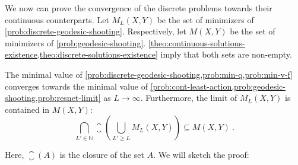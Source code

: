 We now can prove the convergence of the discrete problems towards their continuous counterparts.
Let $M_L(X, Y)$ be the set of minimizers of \cref{prob:discrete-geodesic-shooting}.
Respectively, let $M(X, Y)$ be the set of minimizers of \cref{prob:geodesic-shooting}.
\cref{theo:continuous-solutions-existence,theo:discrete-solutions-existence} imply that both sets are non-empty.
\begin{theorem}
	\label{theo:problem-convergence}
	The minimal value of \cref{prob:discrete-geodesic-shooting,prob:min-q,prob:min-v-f} converges towards the minimal value of \cref{prob:cont-least-action,prob:geodesic-shooting,prob:resnet-limit} as $L \rightarrow \infty$.
	Furthermore, the limit of $M_L(X, Y)$ is contained in $M(X, Y)$:
	\begin{equation}
	\label{eq:limit-adherence}
		\bigcap_{L' \in \mathbb{N}} \closure\left(\bigcup_{L' \geq L} M_L(X, Y)\right) \subseteq M(X, Y) \ .
	\end{equation}
\end{theorem}
Here, $\closure (A)$ is the closure of the set $A$.
We will sketch the proof:
